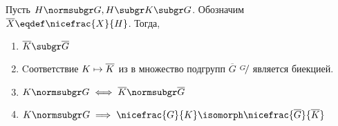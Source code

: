{
\renewcommand*{\factorgr}[2]{%
  \ifstrempty{#2}%
  {\ensuremath{\overline{#1}}}%
  {\ensuremath{\nicefrac{#1}{#2}}}}
\newcommand{\ffgr}[2]{\factorgr{\factorgr{#1}{}}{\factorgr{#2}{}}}
\begin{theorem}
  Пусть $H\normsubgr G, H\subgr K\subgr G$. Обозначим $\factorgr{X}{}\eqdef \factorgr{X}{H}$. Тогда,
  \begin{enumerate}
    \item $\factorgr{K}{}\subgr \factorgr{G}{}$
    \item Cоответствие $K\mapsto \factorgr{K}{}$ из  в множество подгрупп \factorgr{G}{} является биекцией.
    \item $K\normsubgr G \iff \factorgr{K}{}\normsubgr\factorgr{G}{}$
    \item $K\normsubgr G \implies \factorgr{G}{K}\isomorph\ffgr{G}{K}$
  \end{enumerate}
\end{theorem}

}
